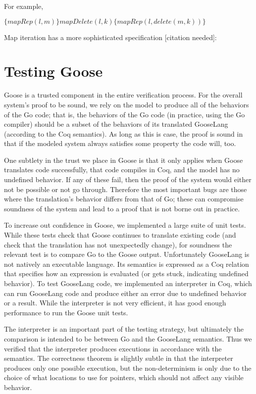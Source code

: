 For example,

$\{mapRep(l, m)\} mapDelete(l, k) \{mapRep(l, delete(m, k))\}$

Map iteration has a more sophisticated specification [citation
needed]:


\section{Testing Goose}

Goose is a trusted component in the entire verification process. For the
overall system's proof to be sound, we rely on the model to produce all
of the behaviors of the Go code; that is, the behaviors of the Go code
(in practice, using the Go compiler) should be a subset of the behaviors
of its translated GooseLang (according to the Coq semantics). As long as
this is case, the proof is sound in that if the modeled system always
satisfies some property the code will, too.

One subtlety in the trust we place in Goose is that it only applies when
Goose translates code successfully, that code compiles in Coq, and the
model has no undefined behavior. If any of these fail, then the proof of
the system would either not be possible or not go through. Therefore the
most important bugs are those where the translation's behavior differs
from that of Go; these can compromise soundness of the system and lead
to a proof that is not borne out in practice.

To increase out confidence in Goose, we implemented a large suite of
unit tests. While these tests check that Goose continues to translate
existing code (and check that the translation has not unexpectedly
change), for soundness the relevant test is to compare Go to the Goose
output. Unfortunately GooseLang is not natively an executable language.
Its semantics is expressed as a Coq relation that specifies how an
expression is evaluated (or gets stuck, indicating undefined behavior).
To test GooseLang code, we implemented an interpreter in Coq, which can
run GooseLang code and produce either an error due to undefined behavior
or a result. While the interpreter is not very efficient, it has good
enough performance to run the Goose unit tests.

The interpreter is an important part of the testing strategy, but
ultimately the comparison is intended to be between Go and the GooseLang
semantics. Thus we verified that the interpreter produces executions in
accordance with the semantics. The correctness theorem is slightly
subtle in that the interpreter produces only one possible execution, but
the non-determinism is only due to the choice of what locations to use
for pointers, which should not affect any visible behavior.

